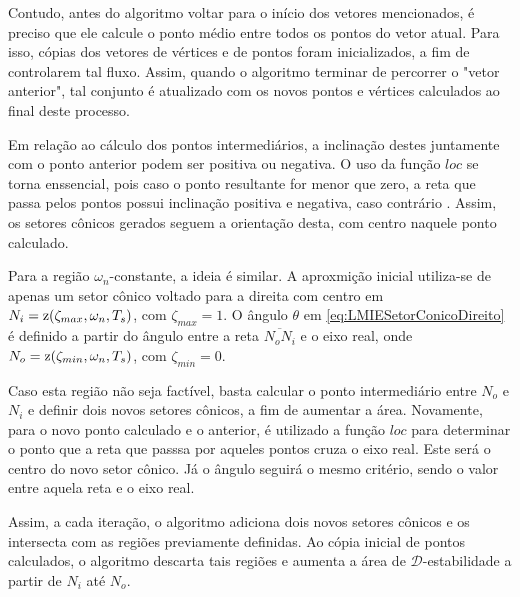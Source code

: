 Contudo, antes do algoritmo voltar para o início dos vetores mencionados, é preciso que ele calcule o ponto médio entre todos os pontos do vetor atual. Para isso, cópias dos vetores de vértices e de pontos foram inicializados, a fim de controlarem tal fluxo. Assim, quando o algoritmo terminar de percorrer o "vetor anterior", tal conjunto é atualizado com os novos pontos e vértices calculados ao final deste processo.

Em relação ao cálculo dos pontos intermediários, a inclinação destes juntamente com o ponto anterior podem ser positiva ou negativa. O uso da função $loc$ se torna enssencial, pois caso o ponto resultante for menor que zero, a reta que passa pelos pontos possui inclinação positiva e negativa, caso contrário \cite{WISNIEWSKI2019}. Assim, os setores cônicos gerados seguem a orientação desta, com centro naquele ponto calculado.

Para a região $\omega_n$-constante, a ideia é similar. A aproxmição inicial utiliza-se de apenas um setor cônico voltado para a direita com centro em $N_i = \operatorname{\mathrm{z}}(\zeta_{max},\omega_n,T_s)$, com $\zeta_{max} = 1$. O ângulo $\theta$ em \eqref{eq:LMIESetorConicoDireito} é definido a partir do ângulo entre a reta $\overline{N_oN_i}$ e o eixo real, onde $N_o = \operatorname{\mathrm{z}}(\zeta_{min},\omega_n,T_s)$, com $\zeta_{min} = 0$.

Caso esta região não seja factível, basta calcular o ponto intermediário entre $N_o$ e $N_i$ e definir dois novos setores cônicos, a fim de aumentar a área. Novamente, para o novo ponto calculado e o anterior, é utilizado a função $loc$ para determinar o ponto que a reta que passsa por aqueles pontos cruza o eixo real. Este será o centro do novo setor cônico. Já o ângulo seguirá o mesmo critério, sendo o valor entre aquela reta e o eixo real.

Assim, a cada iteração, o algoritmo adiciona dois novos setores cônicos e os intersecta com as regiões previamente definidas. Ao cópia inicial de pontos calculados, o algoritmo descarta tais regiões e aumenta a área de $\mathscr{D}$-estabilidade a partir de $N_i$ até $N_o$.


